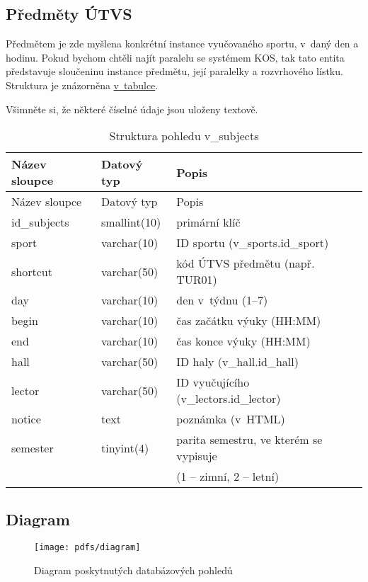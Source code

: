 \subsection{Předměty ÚTVS}\label{pux159edmux11bty-uxfatvs}

Předmětem je zde myšlena konkrétní instance vyučovaného sportu, v~daný den a hodinu. Pokud bychom chtěli najít paralelu se systémem KOS, tak tato entita představuje sloučeninu instance předmětu, její paralelky a rozvrhového lístku. Struktura je znázorněna \protect\hyperlink{tab:subjects}{v~tabulce}.

Všimněte si, že některé číselné údaje jsou uloženy textově.

\begin{longtable}[]{@{}lll@{}}
\caption{Struktura pohledu v\_subjects \label{tab:subjects}}\tabularnewline
\toprule
Název sloupce & Datový typ & Popis\tabularnewline
\midrule
\endfirsthead
\toprule
Název sloupce & Datový typ & Popis\tabularnewline
\midrule
\endhead
id\_subjects & smallint(10) & primární klíč\tabularnewline
sport & varchar(10) & ID sportu (v\_sports.id\_sport)\tabularnewline
shortcut & varchar(50) & kód ÚTVS předmětu (např. TUR01)\tabularnewline
day & varchar(10) & den v~týdnu (1–7)\tabularnewline
begin & varchar(10) & čas začátku výuky (HH:MM)\tabularnewline
end & varchar(10) & čas konce výuky (HH:MM)\tabularnewline
hall & varchar(50) & ID haly (v\_hall.id\_hall)\tabularnewline
lector & varchar(50) & ID vyučujícího (v\_lectors.id\_lector)\tabularnewline
notice & text & poznámka (v~HTML)\tabularnewline
semester & tinyint(4) & parita semestru, ve kterém se vypisuje\tabularnewline
\begin{minipage}[t]{0.32\columnwidth}\raggedright\strut
\strut
\end{minipage} & \begin{minipage}[t]{0.32\columnwidth}\raggedright\strut
\strut
\end{minipage} & \begin{minipage}[t]{0.32\columnwidth}\raggedright\strut
(1 -- zimní, 2 -- letní)\strut
\end{minipage}\tabularnewline
\bottomrule
\end{longtable}

\subsection{Diagram}\label{diagram}

\begin{figure}
\centering
\texttt{[image: pdfs/diagram]}
\caption{Diagram poskytnutých databázových pohledů \autocite{rozvojwiki}\label{pic:diagram}}
\end{figure}

